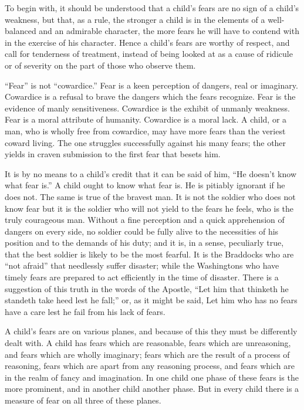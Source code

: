 \documentclass[
]{book}
\begin{document}
To begin with, it should be understood that a child's fears are no sign of a child's weakness, but that, as a rule, the stronger a child is in the elements of a well-balanced and an admirable character, the more fears he will have to contend with in the exercise of his character. Hence a child's fears are worthy of respect, and call for tenderness of treatment, instead of being looked at as a cause of ridicule or of severity on the part of those who observe them.

``Fear'' is not ``cowardice.'' Fear is a keen perception of dangers, real or imaginary. Cowardice is a refusal to brave the dangers which the fears recognize. Fear is the evidence of manly sensitiveness. Cowardice is the exhibit of unmanly weakness. Fear is a moral attribute of humanity. Cowardice is a moral lack. A child, or a man, who is wholly free from cowardice, may have more fears than the veriest coward living. The one struggles successfully against his many fears; the other yields in craven submission to the first fear that besets him.

It is by no means to a child's credit that it can be said of him, ``He doesn't know what fear is.'' A child ought to know what fear is. He is pitiably ignorant if he does not. The same is true of the bravest man. It is not the soldier who does not know fear but it is the soldier who will not yield to the fears he feels, who is the truly courageous man. Without a fine perception and a quick apprehension of dangers on every side, no soldier could be fully alive to the necessities of his position and to the demands of his duty; and it is, in a sense, peculiarly true, that the best soldier is likely to be the most fearful. It is the Braddocks who are ``not afraid'' that needlessly suffer disaster; while the Washingtons who have timely fears are prepared to act efficiently in the time of disaster. There is a suggestion of this truth in the words of the Apostle, ``Let him that thinketh he standeth take heed lest he fall;'' or, as it might be said, Let him who has no fears have a care lest he fail from his lack of fears.

A child's fears are on various planes, and because of this they must be differently dealt with. A child has fears which are reasonable, fears which are unreasoning, and fears which are wholly imaginary; fears which are the result of a process of reasoning, fears which are apart from any reasoning process, and fears which are in the realm of fancy and imagination. In one child one phase of these fears is the more prominent, and in another child another phase. But in every child there is a measure of fear on all three of these planes.
\end{document}
